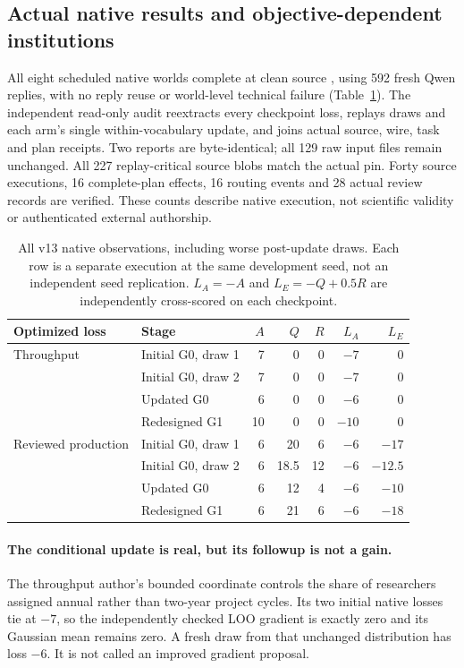 \subsection{Actual native results and objective-dependent institutions}

All eight scheduled native worlds complete at clean source ,
using 592 fresh Qwen replies, with no reply reuse or world-level technical
failure (Table~\ref{tab:nested-results-v13}). The independent read-only audit
reextracts every checkpoint loss, replays draws and each arm's single
within-vocabulary update, and joins actual source, wire, task and plan receipts. Two reports are
byte-identical; all 129 raw input files remain unchanged. All 227 replay-critical
source blobs match the actual pin. Forty source executions, 16 complete-plan
effects, 16 routing events and 28 actual review records are verified. These
counts describe native execution, not scientific validity or authenticated
external authorship.

\begin{table}[t]
\caption{All v13 native observations, including worse post-update draws.
Each row is a separate execution at the same development seed, not an
independent seed replication. $L_A=-A$ and $L_E=-Q+0.5R$ are independently
cross-scored on each checkpoint.}
\label{tab:nested-results-v13}
\centering
\small
\begin{tabular}{llrrrrr}
\toprule
Optimized loss & Stage & $A$ & $Q$ & $R$ & $L_A$ & $L_E$ \\
\midrule
Throughput & Initial G0, draw 1 & 7 & 0 & 0 & $-7$ & 0 \\
 & Initial G0, draw 2 & 7 & 0 & 0 & $-7$ & 0 \\
 & Updated G0 & 6 & 0 & 0 & $-6$ & 0 \\
 & Redesigned G1 & 10 & 0 & 0 & $-10$ & 0 \\
\addlinespace[3pt]
Reviewed production & Initial G0, draw 1 & 6 & 20 & 6 & $-6$ & $-17$ \\
 & Initial G0, draw 2 & 6 & 18.5 & 12 & $-6$ & $-12.5$ \\
 & Updated G0 & 6 & 12 & 4 & $-6$ & $-10$ \\
 & Redesigned G1 & 6 & 21 & 6 & $-6$ & $-18$ \\
\bottomrule
\end{tabular}
\end{table}

\paragraph{The conditional update is real, but its followup is not a gain.}
The throughput author's bounded coordinate controls the share of researchers
assigned annual rather than two-year project cycles. Its two initial native
losses tie at $-7$, so the independently checked LOO gradient is exactly zero
and its Gaussian mean remains zero. A fresh draw from that unchanged
distribution has loss $-6$. It is not called an improved gradient proposal.

